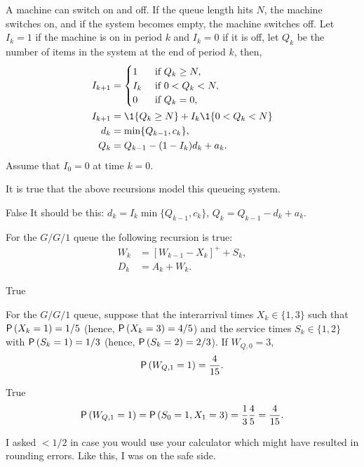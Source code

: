 \begin{exercise}[201703] A machine can switch on and off. If the queue length
  hits $N$, the machine switches on, and if the system becomes empty,
  the machine switches off.  Let $I_k=1$ if the machine is on in
  period $k$ and $I_k=0$ if it is off, let $Q_k$ be the number of
  items in the system at the end of period $k$, then, 
    \begin{align*}
      I_{k+1} &=
      \begin{cases}
        1 & \text{ if } Q_{k} \geq N,\\
        I_k & \text{ if } 0< Q_{k} <N,\\
        0 & \text{ if }  Q_{k} =0,\\
      \end{cases}\\
  I_{k+1} &= \1{Q_k\geq N} + I_k \1{0<Q_k<N} \\
d_k &=\min\{Q_{k-1}, c_k\}, \\
Q_k &= Q_{k-1} - (1-I_k) d_k + a_k.
    \end{align*}
    Assume that $I_0 =0$ at time $k=0$. 

It is true that the above
    recursions model this queueing system.

\begin{solution}
    False
It should be this: $d_k =I_k \min\{Q_{k-1}, c_k\}$,  $Q_k = Q_{k-1} - d_k + a_k$.

\end{solution}
\end{exercise}


\begin{exercise}[201703]
For the $G/G/1$ queue the following recursion is true: 
\begin{align*}
  W_{k} &= [W_{k-1} - X_k]^+ + S_k,\\
  D_k &= A_k + W_k.
\end{align*}

\begin{solution}
    True
\end{solution}
\end{exercise}

\begin{exercise}[201703]
  For the $G/G/1$ queue, suppose that the interarrival times
  $X_k\in\{1,3\}$ such that $\P{X_k=1}=1/5$ (hence, $\P{X_k=3}=4/5$)
  and the service times $S_k\in\{1,2\}$ with $\P{S_k=1}=1/3$ (hence,
  $\P{S_k=2}=2/3$). If $W_{Q,0}=3$,
  \begin{equation*}
    \P{W_{Q,1} = 1} =\frac4{15}.
  \end{equation*}

\begin{solution}
    True
  \begin{equation*}
    \P{W_{Q,1} = 1} = \P{S_0=1, X_1=3}=\frac13\frac 45 = \frac4{15}.
  \end{equation*}

  I asked $<1/2$ in case you would use your calculator which might
  have resulted in rounding errors. Like this, I was on the safe side.
\end{solution}
\end{exercise}

